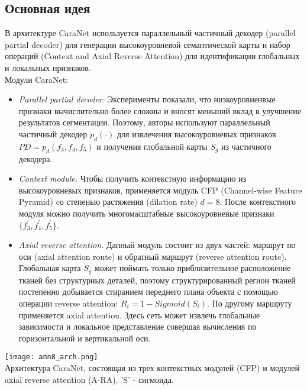 \subsection*{Основная идея}
В архитектуре CaraNet используется параллельный частичный декодер 
(parallel partial decoder) для генерации высокоуровневой семантической
карты и набор операций (Context and Axial Reverse Attention) для 
идентификации глобальных и локальных признаков. 
\\Модули CaraNet:
\begin{itemize}
    \item \textit{Parallel partial decoder.} Эксперименты показали,
    что низкоуровненвые признаки вычислительно более сложны и вносят 
    меньший вклад в улучшение результатов сегментации. Поэтому, авторы 
    используют параллельный частичный декодер \(p_d(\cdot)\) для извлечения 
    высокоуровневых признаков \(PD=p_d(f_3,f_4,f_5)\) и получения глобальной карты 
    \(S_g\) из частичного декодера.
    \item \textit{Context module.} Чтобы получить контекстную информацию из высокоуровневых
    признаков, применяется модуль CFP (Channel-wise Feature Pyramid) cо степенью растяжения 
    (dilation rate) \(d=8\). После контекстного модуля можно получить многомасштабные 
    высокоуровневые признаки \(\{f_{3}^{'}, f_{4}^{'}, f_{5}^{'}\}\).
    \item \textit{Axial reverse attention.} Данный модуль состоит из двух частей:
    маршрут по оси (axial attention route) и обратный маршрут (reverse attention route). Глобальная 
    карта \(S_g\) может поймать только приблизительное расположение тканей без структурных деталей, 
    поэтому структурированный регион тканей постепенно добывается стиранием переднего плана 
    объекта с помощью операции reverse attention: \(R_{i}=1-Sigmoid(S_{i})\). По другому 
    маршруту применяется axial attention. Здесь сеть может извлечь глобальные зависимости и 
    локальное представление совершая вычисления по горизонтальной и вертикальной оси. 
\end{itemize}
\begin{minipage}{1.0\linewidth}
    \begin{center}
        \texttt{[image: ann8\_arch.png]} \\
        \caption{\scriptsize{Архитектура CaraNet, состоящая из трех контекстных модулей (CFP) и 
        модулей axial reverse attention (A-RA). 'S' - сигмоида.}}
    \end{center}
    
\end{minipage}
